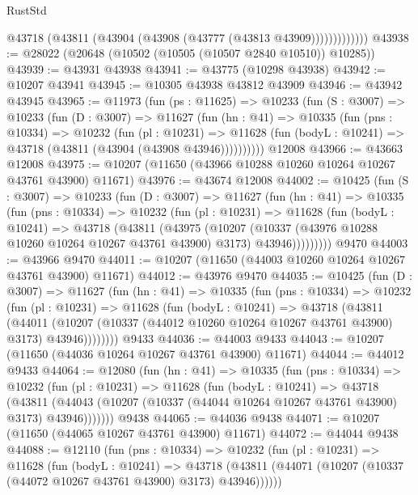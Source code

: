 \begin{lexlean}{RustStd}
\begin{coremodule}
                  @43718 (@43811 (@43904 (@43908 (@43777 (@43813 @43909)))))))))))))
@43938 := @28022 (@20648 (@10502 (@10505 (@10507 @2840 @10510)) @10285))
@43939 := @43931 @43938
@43941 := @43775 (@10298 @43938)
@43942 := @10207 @43941
@43945 := @10305 @43938 @43812 @43909
@43946 := @43942 @43945
@43965 := @11973
    (fun (ps : @11625) =>
    @10233
      (fun (S : @3007) =>
      @10233
        (fun (D : @3007) =>
        @11627
          (fun (hn : @41) =>
          @10335
            (fun (pns : @10334) =>
            @10232
              (fun (pl : @10231) =>
              @11628 (fun (bodyL : @10241) => @43718 (@43811 (@43904 (@43908 @43946))))))))))
    @12008
@43966 := @43663 @12008
@43975 := @10207 (@11650 (@43966 @10288 @10260 @10264 @10267 @43761 @43900) @11671)
@43976 := @43674 @12008
@44002 := @10425
    (fun (S : @3007) =>
    @10233
      (fun (D : @3007) =>
      @11627
        (fun (hn : @41) =>
        @10335
          (fun (pns : @10334) =>
          @10232
            (fun (pl : @10231) =>
            @11628
              (fun (bodyL : @10241) =>
              @43718
                (@43811
                  (@43975
                    (@10207
                      (@10337 (@43976 @10288 @10260 @10264 @10267 @43761 @43900) @3173)
                      @43946)))))))))
    @9470
@44003 := @43966 @9470
@44011 := @10207 (@11650 (@44003 @10260 @10264 @10267 @43761 @43900) @11671)
@44012 := @43976 @9470
@44035 := @10425
    (fun (D : @3007) =>
    @11627
      (fun (hn : @41) =>
      @10335
        (fun (pns : @10334) =>
        @10232
          (fun (pl : @10231) =>
          @11628
            (fun (bodyL : @10241) =>
            @43718
              (@43811
                (@44011
                  (@10207 (@10337 (@44012 @10260 @10264 @10267 @43761 @43900) @3173) @43946))))))))
    @9433
@44036 := @44003 @9433
@44043 := @10207 (@11650 (@44036 @10264 @10267 @43761 @43900) @11671)
@44044 := @44012 @9433
@44064 := @12080
    (fun (hn : @41) =>
    @10335
      (fun (pns : @10334) =>
      @10232
        (fun (pl : @10231) =>
        @11628
          (fun (bodyL : @10241) =>
          @43718
            (@43811
              (@44043 (@10207 (@10337 (@44044 @10264 @10267 @43761 @43900) @3173) @43946)))))))
    @9438
@44065 := @44036 @9438
@44071 := @10207 (@11650 (@44065 @10267 @43761 @43900) @11671)
@44072 := @44044 @9438
@44088 := @12110
    (fun (pns : @10334) =>
    @10232
      (fun (pl : @10231) =>
      @11628
        (fun (bodyL : @10241) =>
        @43718 (@43811 (@44071 (@10207 (@10337 (@44072 @10267 @43761 @43900) @3173) @43946))))))

\end{coremodule}
\end{lexlean}

